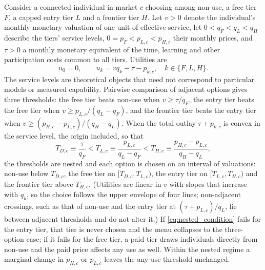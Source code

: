 \documentclass[11pt]{article}
\theoremstyle{definition}
\theoremstyle{remark}
\begin{document}
Consider a connected individual in market $c$ choosing among non-use, a free tier $F$, a capped entry tier $L$ and a frontier tier $H$. Let $v>0$ denote the individual's monthly monetary valuation of one unit of effective service, let $0<q_F<q_L<q_H$ describe the tiers' service levels, $0=p_{F}<p_{L,c}<p_{H,c}$ their monthly prices, and $\tau>0$ a monthly monetary equivalent of the time, learning and other participation costs common to all tiers. Utilities are
\begin{equation}
 u_0=0,\qquad u_k=vq_k-\tau-p_{k,c},\quad k\in\{F,L,H\}.
 \label{eq:tier_utilities}
\end{equation}
The service levels are theoretical objects that need not correspond to particular models or measured capability. Pairwise comparison of adjacent options gives three thresholds: the free tier beats non-use when $v\geq\tau/q_F$, the entry tier beats the free tier when $v\geq p_{L,c}/(q_L-q_F)$, and the frontier tier beats the entry tier when $v\geq(p_{H,c}-p_{L,c})/(q_H-q_L)$. When the total outlay $\tau+p_{k,c}$ is convex in the service level, the origin included, so that
\begin{equation}
 T_{D,c}\equiv\frac{\tau}{q_F}<T_{L,c}\equiv\frac{p_{L,c}}{q_L-q_F}<T_{H,c}\equiv\frac{p_{H,c}-p_{L,c}}{q_H-q_L},
 \label{eq:nested_condition}
\end{equation}
the thresholds are nested and each option is chosen on an interval of valuations: non-use below $T_{D,c}$, the free tier on $[T_{D,c},T_{L,c})$, the entry tier on $[T_{L,c},T_{H,c})$ and the frontier tier above $T_{H,c}$. (Utilities are linear in $v$ with slopes that increase with $q_k$, so the choice follows the upper envelope of four lines; non-adjacent crossings, such as that of non-use and the entry tier at $(\tau+p_{L,c})/q_L$, lie between adjacent thresholds and do not alter it.) If \eqref{eq:nested_condition} fails for the entry tier, that tier is never chosen and the menu collapses to the three-option case; if it fails for the free tier, a paid tier draws individuals directly from non-use and the paid price affects any use as well. Within the nested regime a marginal change in $p_{H,c}$ or $p_{L,c}$ leaves the any-use threshold unchanged.
\end{document}
